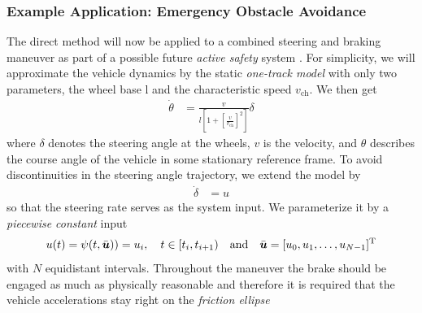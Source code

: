 \subsubsection{Example Application: Emergency Obstacle Avoidance}\label{S:57.3.2.2}

The direct method will now be applied to a combined steering and braking maneuver as part of a possible future \emph{active safety} system \cite{werling2012cdc}. %
For simplicity, we will approximate the vehicle dynamics by the static \emph{one-track model} with only two parameters, the wheel base l and the characteristic speed $v_\mathrm{ch}$. We then get
\begin{align}
\label{equ:thetadot}
\dot \theta &= \frac{v}{l \left[ 1 + \left[\frac{v}{v_{\text{ch}}}\right]^2\right]} \delta
\end{align}
where $\delta$ denotes the steering angle at the wheels, $v$ is the velocity, and $\theta$ describes the course angle of the vehicle in some stationary reference frame. To avoid discontinuities in the steering angle trajectory, we extend the model by
\begin{align*}
\dot \delta &= u
\end{align*}
so that the steering rate serves as the system input. We parameterize it by a \emph{piecewise constant} input
\begin{align*}
u(t)=\psi(t,\bar{\boldsymbol{u}}))=u_i, \quad  t \in [t_i,t_{i+1}) \quad \text{and} \quad \bar{\boldsymbol{u}} = [u_0,u_1,\dots,u_{N-1}]^{{\rm T}}
\end{align*}
with $N$ equidistant intervals.
Throughout the maneuver the brake should be engaged as much as physically reasonable and therefore it is required that the vehicle accelerations stay right on the \emph{friction ellipse}

